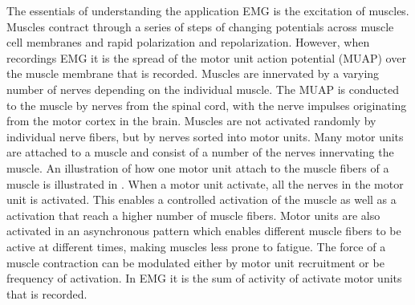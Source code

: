 
The essentials of understanding the application EMG is the excitation of muscles. Muscles contract through a series of steps of changing potentials across muscle cell membranes and rapid polarization and repolarization. However, when recordings EMG it is the spread of the motor unit action potential (MUAP) over the muscle membrane that is recorded. \cite{Cram2012} 
Muscles are innervated by a varying number of nerves depending on the individual muscle. The MUAP is conducted to the muscle by nerves from the spinal cord, with the nerve impulses originating from the motor cortex in the brain. Muscles are not activated randomly by individual nerve fibers, but by nerves sorted into motor units. Many motor units are attached to a muscle and consist of a number of the nerves innervating the muscle. An illustration of how one motor unit attach to the muscle fibers of a muscle is illustrated in . When a motor unit activate, all the nerves in the motor unit is activated. This enables a controlled activation of the muscle as well as a activation that reach a higher number of muscle fibers. Motor units are also activated in an asynchronous pattern which enables different muscle fibers to be active at different times, making muscles less prone to fatigue. %
The force of a muscle contraction can be modulated either by motor unit recruitment or be frequency of activation. In EMG it is the sum of activity of activate motor units that is recorded. \cite{Cram2012}

